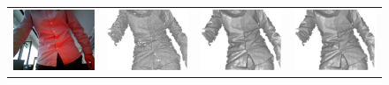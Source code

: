 \begin{figure}[!ht]
{\begin{tabular}{c|c c c}
   \includegraphics[height = 0.19\linewidth]{figures/methodology/ratio_shirt_rgb.pdf} 
   &
   \includegraphics[height = 0.19\linewidth]{figures/methodology/ratio_shirt_shape_init.pdf} &
   \includegraphics[height = 0.19\linewidth]{figures/methodology/ratio_shirt_shape_smooth.pdf} &
   \includegraphics[height = 0.19\linewidth]{figures/methodology/ratio_shirt_shape.pdf} \\


\end{tabular}}
\end{figure}
